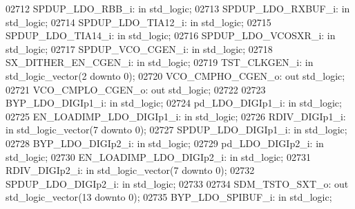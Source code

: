 \begin{DoxyCode}
02712     SPDUP\_LDO\_RBB\_i:    \textcolor{keywordflow}{in} \textcolor{comment}{std\_logic};
02713     SPDUP\_LDO\_RXBUF\_i:  \textcolor{keywordflow}{in} \textcolor{comment}{std\_logic};
02714     SPDUP\_LDO\_TIA12\_i:  \textcolor{keywordflow}{in} \textcolor{comment}{std\_logic};
02715     SPDUP\_LDO\_TIA14\_i:  \textcolor{keywordflow}{in} \textcolor{comment}{std\_logic};
02716     SPDUP\_LDO\_VCOSXR\_i: \textcolor{keywordflow}{in} \textcolor{comment}{std\_logic};
02717     SPDUP\_VCO\_CGEN\_i:   \textcolor{keywordflow}{in} \textcolor{comment}{std\_logic};
02718     SX\_DITHER\_EN\_CGEN\_i:    \textcolor{keywordflow}{in} \textcolor{comment}{std\_logic};
02719     TST\_CLKGEN\_i:   \textcolor{keywordflow}{in} \textcolor{comment}{std\_logic\_vector}(\textcolor{vhdllogic}{}\textcolor{vhdllogic}{2} \textcolor{keywordflow}{downto} \textcolor{vhdllogic}{}\textcolor{vhdllogic}{0});
02720     VCO\_CMPHO\_CGEN\_o:   \textcolor{keywordflow}{out}  \textcolor{comment}{std\_logic};
02721     VCO\_CMPLO\_CGEN\_o:   \textcolor{keywordflow}{out}  \textcolor{comment}{std\_logic};
02722     
02723     BYP\_LDO\_DIGIp1\_i:   \textcolor{keywordflow}{in} \textcolor{comment}{std\_logic};
02724     pd\_LDO\_DIGIp1\_i:    \textcolor{keywordflow}{in} \textcolor{comment}{std\_logic};
02725     EN\_LOADIMP\_LDO\_DIGIp1\_i:    \textcolor{keywordflow}{in} \textcolor{comment}{std\_logic};
02726     RDIV\_DIGIp1\_i:  \textcolor{keywordflow}{in} \textcolor{comment}{std\_logic\_vector}(\textcolor{vhdllogic}{}\textcolor{vhdllogic}{7} \textcolor{keywordflow}{downto} \textcolor{vhdllogic}{}\textcolor{vhdllogic}{0});
02727     SPDUP\_LDO\_DIGIp1\_i: \textcolor{keywordflow}{in} \textcolor{comment}{std\_logic};
02728     BYP\_LDO\_DIGIp2\_i:   \textcolor{keywordflow}{in} \textcolor{comment}{std\_logic};
02729     pd\_LDO\_DIGIp2\_i:    \textcolor{keywordflow}{in} \textcolor{comment}{std\_logic};
02730     EN\_LOADIMP\_LDO\_DIGIp2\_i:    \textcolor{keywordflow}{in} \textcolor{comment}{std\_logic};
02731     RDIV\_DIGIp2\_i:  \textcolor{keywordflow}{in} \textcolor{comment}{std\_logic\_vector}(\textcolor{vhdllogic}{}\textcolor{vhdllogic}{7} \textcolor{keywordflow}{downto} \textcolor{vhdllogic}{}\textcolor{vhdllogic}{0});
02732     SPDUP\_LDO\_DIGIp2\_i: \textcolor{keywordflow}{in} \textcolor{comment}{std\_logic};
02733     
02734     SDM\_TSTO\_SXT\_o: \textcolor{keywordflow}{out} \textcolor{comment}{std\_logic\_vector}(\textcolor{vhdllogic}{}\textcolor{vhdllogic}{13} \textcolor{keywordflow}{downto} \textcolor{vhdllogic}{}\textcolor{vhdllogic}{0});
02735     BYP\_LDO\_SPIBUF\_i:   \textcolor{keywordflow}{in} \textcolor{comment}{std\_logic};

\end{DoxyCode}

